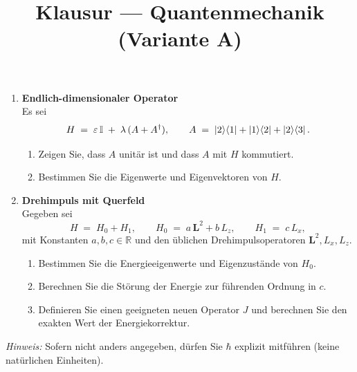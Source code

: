 \documentclass[11pt,a4paper]{article}
\begin{document}
\begin{enumerate}
\item \textbf{Endlich-dimensionaler Operator}\\
Es sei
\[
H \;=\; \varepsilon\,\mathbb I \;+\; \lambda\,(A + A^\dagger),\qquad
A \;=\; \ket{2}\!\bra{1} + \ket{1}\!\bra{2} + \ket{2}\!\bra{3}.
\]
\begin{enumerate}
  \item Zeigen Sie, dass \(A\) unitär ist und dass \(A\) mit \(H\) kommutiert.
  \item Bestimmen Sie die Eigenwerte und Eigenvektoren von \(H\).
\end{enumerate}

\item \textbf{Drehimpuls mit Querfeld}\\
Gegeben sei
\[
H \;=\; H_0 + H_1,\qquad
H_0 \;=\; a\,\mathbf L^2 + b\,L_z,\qquad
H_1 \;=\; c\,L_x,
\]
mit Konstanten \(a,b,c\in\mathbb R\) und den üblichen Drehimpulsoperatoren \(\mathbf L^2, L_x, L_z\).
\begin{enumerate}
  \item Bestimmen Sie die Energieeigenwerte und Eigenzustände von \(H_0\).
  \item Berechnen Sie die Störung der Energie zur führenden Ordnung in \(c\).
  \item Definieren Sie einen geeigneten neuen Operator \(J\) und berechnen Sie den exakten Wert der Energiekorrektur.
\end{enumerate}

\end{enumerate}

\vfill
\noindent\textit{Hinweis:} Sofern nicht anders angegeben, dürfen Sie \(\hbar\) explizit mitführen (keine natürlichen Einheiten).




\pagebreak


\title{Klausur — Quantenmechanik (Variante A)}\author{}\date{}
\end{document}
